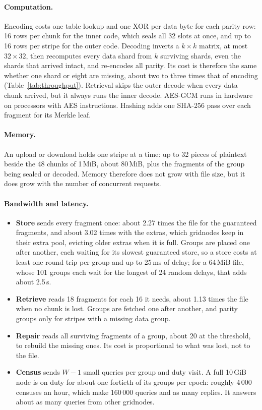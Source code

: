 \documentclass[10pt,a4paper,final]{article}
\begin{document}
\paragraph{Computation.} Encoding costs one table lookup and one XOR per data byte for each parity row: 16 rows per
chunk for the inner code, which seals all 32 slots at once, and up to 16 rows per stripe for the outer code. Decoding
inverts a $k \times k$ matrix, at most $32 \times 32$, then recomputes every data shard from $k$ surviving shards,
even the shards that arrived intact, and re-encodes all parity. Its cost is therefore the same whether one shard or
eight are missing, about two to three times that of encoding (Table~\ref{tab:throughput}). Retrieval skips the
outer decode when every data chunk arrived, but it always runs the inner decode. AES-GCM runs in hardware on
processors with AES instructions. Hashing adds one SHA-256 pass over each fragment for its Merkle leaf.

\paragraph{Memory.} An upload or download holds one stripe at a time: up to 32 pieces of plaintext beside the 48
chunks of 1\,MiB, about 80\,MiB, plus the fragments of the group being sealed or decoded. Memory therefore does not
grow with file size, but it does grow with the number of concurrent requests.

\paragraph{Bandwidth and latency.}

\begin{itemize}
	\item \textbf{Store} sends every fragment once: about 2.27 times the file for the guaranteed fragments, and
	      about 3.02 times with the extras, which gridnodes keep in their extra pool, evicting older extras when it
	      is full. Groups are placed one after
	      another, each waiting for its slowest guaranteed store, so a store costs at least one round trip per group
	      and up to 25\,ms of delay; for a 64\,MiB file, whose 101 groups each wait for the longest of 24 random
	      delays, that adds about 2.5\,s.
	\item \textbf{Retrieve} reads 18 fragments for each 16 it needs, about 1.13 times the file when no chunk is lost.
	      Groups are fetched one after another, and parity groups only for stripes with a missing data group.
	\item \textbf{Repair} reads all surviving fragments of a group, about 20 at the threshold, to rebuild the
	      missing ones. Its cost is proportional to what was lost, not to the file.
	\item \textbf{Census} sends $W - 1$ small queries per group and duty visit. A full 10\,GiB node is on duty for
	      about one fortieth of its groups per epoch: roughly 4\,000 censuses an hour, which make 160\,000 queries
	      and as many replies. It answers about as many queries from other gridnodes.
\end{itemize}
\end{document}
